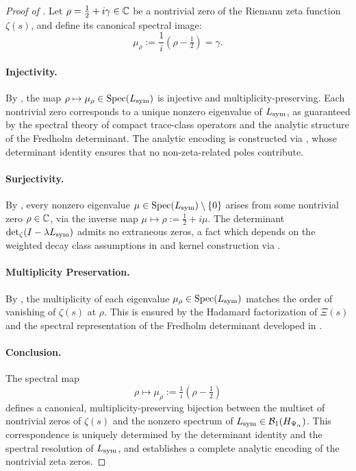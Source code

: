 \begin{proof}[Proof of ]
Let \( \rho = \tfrac{1}{2} + i\gamma \in \mathbb{C} \) be a nontrivial zero of the Riemann zeta function \( \zeta(s) \), and define its canonical spectral image:
\[
\mu_\rho := \frac{1}{i}(\rho - \tfrac{1}{2}) = \gamma.
\]

\paragraph{Injectivity.}
By , the map \( \rho \mapsto \mu_\rho \in \operatorname{Spec}(L_{\mathrm{sym}}) \) is injective and multiplicity-preserving. Each nontrivial zero corresponds to a unique nonzero eigenvalue of \( L_{\mathrm{sym}} \), as guaranteed by the spectral theory of compact trace-class operators and the analytic structure of the Fredholm determinant. The analytic encoding is constructed via , whose determinant identity ensures that no non-zeta-related poles contribute.

\paragraph{Surjectivity.}
By , every nonzero eigenvalue \( \mu \in \operatorname{Spec}(L_{\mathrm{sym}}) \setminus \{0\} \) arises from some nontrivial zero \( \rho \in \mathbb{C} \), via the inverse map \( \mu \mapsto \rho := \tfrac{1}{2} + i\mu \). The determinant \( \det\nolimits_{\zeta}(I - \lambda L_{\mathrm{sym}}) \) admits no extraneous zeros, a fact which depends on the weighted decay class assumptions in  and kernel construction via .

\paragraph{Multiplicity Preservation.}
By , the multiplicity of each eigenvalue \( \mu_\rho \in \operatorname{Spec}(L_{\mathrm{sym}}) \) matches the order of vanishing of \( \zeta(s) \) at \( \rho \). This is ensured by the Hadamard factorization of \( \Xi(s) \) and the spectral representation of the Fredholm determinant developed in .

\paragraph{Conclusion.}
The spectral map
\[
\rho \longmapsto \mu_\rho := \tfrac{1}{i}(\rho - \tfrac{1}{2})
\]
defines a canonical, multiplicity-preserving bijection between the multiset of nontrivial zeros of \( \zeta(s) \) and the nonzero spectrum of \( L_{\mathrm{sym}} \in \mathcal{B}_1(H_{\Psi_\alpha}) \). This correspondence is uniquely determined by the determinant identity and the spectral resolution of \( L_{\mathrm{sym}} \), and establishes a complete analytic encoding of the nontrivial zeta zeros.
\end{proof}
